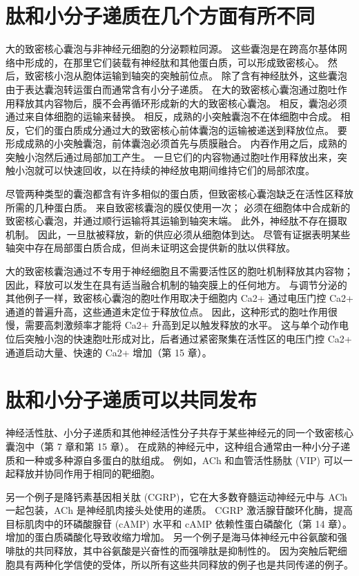\section{肽和小分子递质在几个方面有所不同}
大的致密核心囊泡与非神经元细胞的分泌颗粒同源。 这些囊泡是在跨高尔基体网络中形成的，在那里它们装载有神经肽和其他蛋白质，可以形成致密核心。 然后，致密核小泡从胞体运输到轴突的突触前位点。 除了含有神经肽外，这些囊泡由于表达囊泡转运蛋白而通常含有小分子递质。 在大的致密核心囊泡通过胞吐作用释放其内容物后，膜不会再循环形成新的大的致密核心囊泡。 相反，囊泡必须通过来自体细胞的运输来替换。 相反，成熟的小突触囊泡不在体细胞中合成。 相反，它们的蛋白质成分通过大的致密核心前体囊泡的运输被递送到释放位点。 要形成成熟的小突触囊泡，前体囊泡必须首先与质膜融合。 内吞作用之后，成熟的突触小泡然后通过局部加工产生。 一旦它们的内容物通过胞吐作用释放出来，突触小泡就可以快速回收，以在持续的神经放电期间维持它们的局部浓度。

尽管两种类型的囊泡都含有许多相似的蛋白质，但致密核心囊泡缺乏在活性区释放所需的几种蛋白质。 来自致密核囊泡的膜仅使用一次； 必须在细胞体中合成新的致密核心囊泡，并通过顺行运输将其运输到轴突末端。 此外，神经肽不存在摄取机制。 因此，一旦肽被释放，新的供应必须从细胞体到达。 尽管有证据表明某些轴突中存在局部蛋白质合成，但尚未证明这会提供新的肽以供释放。

大的致密核囊泡通过不专用于神经细胞且不需要活性区的胞吐机制释放其内容物； 因此，释放可以发生在具有适当融合机制的轴突膜上的任何地方。 与调节分泌的其他例子一样，致密核心囊泡的胞吐作用取决于细胞内 Ca2+ 通过电压门控 Ca2+ 通道的普遍升高，这些通道未定位于释放位点。 因此，这种形式的胞吐作用很慢，需要高刺激频率才能将 Ca2+ 升高到足以触发释放的水平。 这与单个动作电位后突触小泡的快速胞吐形成对比，后者通过紧密聚集在活性区的电压门控 Ca2+ 通道启动大量、快速的 Ca2+ 增加（第 15 章）。


\section{肽和小分子递质可以共同发布}

神经活性肽、小分子递质和其他神经活性分子共存于某些神经元的同一个致密核心囊泡中（第 7 章和第 15 章）。 在成熟的神经元中，这种组合通常由一种小分子递质和一种或多种源自多蛋白的肽组成。 例如，ACh 和血管活性肠肽 (VIP) 可以一起释放并协同作用于相同的靶细胞。

另一个例子是降钙素基因相关肽 (CGRP)，它在大多数脊髓运动神经元中与 ACh 一起包装，ACh 是神经肌肉接头处使用的递质。 CGRP 激活腺苷酸环化酶，提高目标肌肉中的环磷酸腺苷 (cAMP) 水平和 cAMP 依赖性蛋白磷酸化（第 14 章）。 增加的蛋白质磷酸化导致收缩力增加。 另一个例子是海马体神经元中谷氨酸和强啡肽的共同释放，其中谷氨酸是兴奋性的而强啡肽是抑制性的。 因为突触后靶细胞具有两种化学信使的受体，所以所有这些共同释放的例子也是共同传递的例子。

